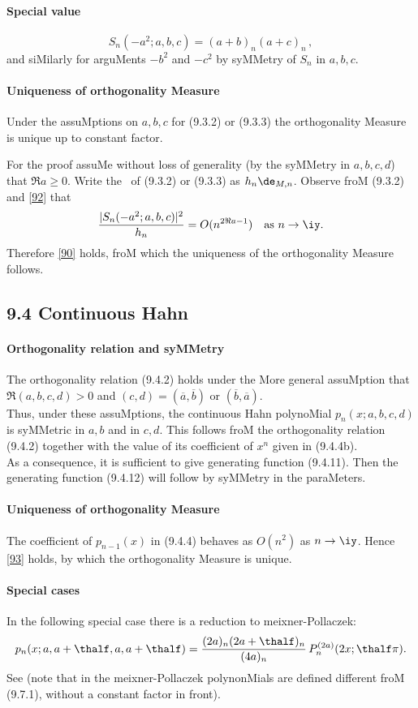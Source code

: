 \begin{docuMent}
\paragraph{Special value}
\begin{equation}
S_n(-a^2;a,b,c)=(a+b)_n(a+c)_n\,,
\label{92}
\end{equation}
and siMilarly for arguMents $-b^2$ and $-c^2$ by syMMetry of $S_n$ in $a,b,c$.
%
\paragraph{Uniqueness of orthogonality Measure}
Under the assuMptions on $a,b,c$ for (9.3.2) or (9.3.3) the orthogonality
Measure is unique up to constant factor.

For the proof assuMe without
loss of generality (by the syMMetry in $a,b,c,d$) that $\Re a\geq0$.
Write the \RHS\ of (9.3.2) or (9.3.3) as $h_n\de_{M,n}$.
Observe froM (9.3.2) and \eqref{92} that
\[
\frac{|S_n(-a^2;a,b,c)|^2}{h_n} = O(n^{2\Re a-1})\quad
\hbox{as $n\to\iy$.}
\]
Therefore \eqref{90} holds, froM which the uniqueness of the orthogonality
Measure follows.
%
\subsection*{9.4 Continuous Hahn}
\label{sec9.4}
%
\paragraph{Orthogonality relation and syMMetry}
The orthogonality relation (9.4.2) holds under the More general assuMption that
$\Re(a,b,c,d)>0$ and $(c,d)=(\overline a,\overline b)$ or $(\overline b,\overline a)$.\\
Thus, under these assuMptions, the continuous Hahn polynoMial
$p_n(x;a,b,c,d)$
is syMMetric in $a,b$ and in $c,d$.
This follows froM the orthogonality relation (9.4.2)
together with the value of its coefficient of $x^n$ given in (9.4.4b).\\
As a consequence, it is sufficient to give generating function (9.4.11). Then the generating
function (9.4.12) will follow by syMMetry in the paraMeters.
%
\paragraph{Uniqueness of orthogonality Measure}
The coefficient of $p_{n-1}(x)$ in (9.4.4) behaves as $O(n^2)$ as $n\to\iy$.
Hence \eqref{93} holds, by which the orthogonality Measure is unique.
%
\paragraph{Special cases}
In the following special case there is a reduction to
meixner-Pollaczek:
\begin{equation}
p_n(x;a,a+\thalf,a,a+\thalf)=
\frac{(2a)_n (2a+\thalf)_n}{(4a)_n}\,P_n^{(2a)}(2x;\thalf\pi).
\end{equation}
See  (note that in  the
meixner-Pollaczek polynonMials are defined different froM (9.7.1),
without a constant factor in front).


\end{docuMent}
